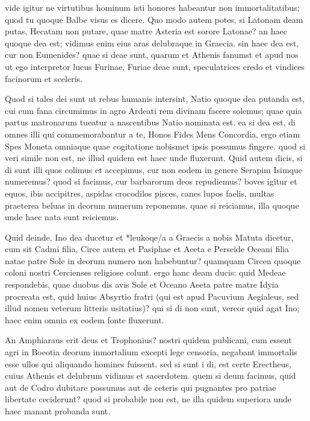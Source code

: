  vide igitur ne virtutibus hominum isti honores habeantur non immortalitatibus; quod tu quoque Balbe visus es dicere. Quo modo autem potes, si Latonam deam putas, Hecatam non putare, quae matre Asteria est sorore Latonae? an haec quoque dea est; vidimus enim eius aras delubraque in Graecia. sin haec dea est, cur non Eumenides? quae si deae sunt, quarum et Athenis fanumst et apud nos ut ego interpretor lucus Furinae, Furiae deae sunt, speculatrices credo et vindices facinorum et sceleris.

 Quod si tales dei sunt ut rebus humanis intersint, Natio quoque dea putanda est, cui cum fana circumimus in agro Ardeati rem divinam facere solemus; quae quia partus matronarum tueatur a nascentibus Natio nominata est. ea si dea est, di omnes illi qui commemorabantur a te, Honos Fides Mens Concordia, ergo etiam Spes Moneta omniaque quae cogitatione nobismet ipsis possumus fingere. quod si veri simile non est, ne illud quidem est haec unde fluxerunt. Quid autem dicis, si di sunt illi quos colimus et accepimus, cur non eodem in genere Serapim Isimque numeremus? quod si facimus, cur barbarorum deos repudiemus? boves igitur et equos, ibis accipitres, aspidas crocodilos pisces, canes lupos faelis, multas praeterea beluas in deorum numerum reponemus. quae si reiciamus, illa quoque unde haec nata sunt reiciemus.

 Quid deinde, Ino dea ducetur et *leukoqe/a a Graecis a nobis Matuta dicetur, cum sit Cadmi filia, Circe autem et Pasiphae et Aeeta e Perseide Oceani filia natae patre Sole in deorum numero non habebuntur? quamquam Circen quoque coloni nostri Cercienses religiose colunt. ergo hanc deam ducis: quid Medeae respondebis, quae duobus dis avis Sole et Oceano Aeeta patre matre Idyia procreata est, quid huius Absyrtio fratri (qui est apud Pacuvium Aegialeus, sed illud nomen veterum litteris usitatius)? qui si di non sunt, vereor quid agat Ino; haec enim omnia ex eodem fonte fluxerunt.

 An Amphiaraus erit deus et Trophonius? nostri quidem publicani, cum essent agri in Boeotia deorum inmortalium excepti lege censoria, negabant immortalis esse ullos qui aliquando homines fuissent. sed si sunt i di, est certe Erectheus, cuius Athenis et delubrum vidimus et sacerdotem. quem si deum facimus, quid aut de Codro dubitare possumus aut de ceteris qui pugnantes pro patriae libertate ceciderunt? quod si probabile non est, ne illa quidem superiora unde haec manant probanda sunt.

